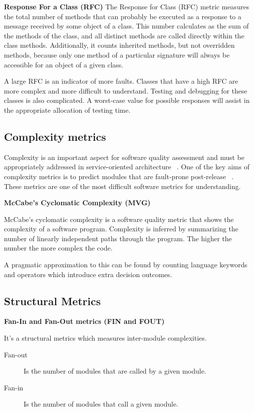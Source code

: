 \textbf{Response For a Class (RFC)} 
The Response for Class (RFC) metric measures the total number of methods that can probably be executed as a response to a message received by some object of a class. This number calculates as the sum of the methods of the class, and all distinct methods are called directly within the class methods. Additionally, it counts inherited methods, but not overridden methods, because only one method of a particular signature will always be accessible for an object of a given class.

A large RFC is an indicator of more faults. Classes that have a high RFC are more complex and more difficult to understand. Testing and debugging for these classes is also complicated. A worst-case value for possible responses will assist in the appropriate allocation of testing time.
\subsection{Complexity metrics}

Complexity is an important aspect for software quality assessment and must be appropriately addressed in service-oriented architecture ~\cite{complexity}. One of the key aims of complexity  metrics is to predict modules that are fault-prone post-release ~\cite{complexity2}. These metrics are one of the most difficult software metrics for understanding.

\textbf{McCabe's Cyclomatic Complexity (MVG)}

McCabe's cyclomatic complexity is a software quality metric that shows the complexity of a software program. Complexity is inferred by summarizing the number of linearly independent paths through the program. The higher the number the more complex the code.

A pragmatic approximation to this can be found by counting language keywords and operators which introduce extra decision outcomes.
\subsection{Structural Metrics}

\textbf{Fan-In and Fan-Out metrics (FIN and FOUT)}

It's a structural metrics which measures inter-module complexities. 
\begin{description}
	\item[Fan-out] Is the number of modules that are called by a given module.
	\item[Fan-in] Is the number of modules that call a given module.
\end{description}


